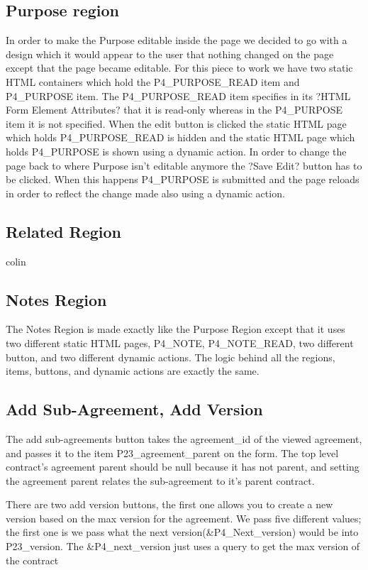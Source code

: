 \documentclass{report}
\begin{document}
\subsection{Purpose region}
In order to make the Purpose editable inside the page we decided to go with a design which it would appear to the user that nothing changed on the page except that the page became editable. For this piece to work we have two static HTML containers which hold the P4\_PURPOSE\_READ item and P4\_PURPOSE item. The P4\_PURPOSE\_READ item specifies in its ?HTML Form Element Attributes? that it is read-only whereas in the P4\_PURPOSE item it is not specified. 
	When the edit button is clicked the static HTML page which holds P4\_PURPOSE\_READ is hidden and the static HTML page which holds P4\_PURPOSE is shown using a dynamic action. In order to change the page back to where Purpose isn't editable anymore the ?Save Edit? button has to be clicked. When this happens P4\_PURPOSE is submitted and the page reloads in order to reflect the change made also using a dynamic action. 


\subsection{Related Region}
colin

\subsection{Notes Region}
The Notes Region is made exactly like the Purpose Region except that it uses two different static HTML pages, P4\_NOTE, P4\_NOTE\_READ, two different button, and two different dynamic actions. The logic behind all the regions, items, buttons, and dynamic actions are exactly the same.

\subsection{Add Sub-Agreement, Add Version}
The add sub-agreements button takes the agreement\_id of the viewed agreement, and passes it to the item P23\_agreement\_parent on the form. The top level contract's agreement parent should be null because it has not parent, and setting the agreement parent relates the sub-agreement to it's parent contract.

There are two add version buttons, the first one allows you to create a new version based on the max version for the agreement. We pass five different values; the first one is we pass what the next version(\&P4\_Next\_version) would be into P23\_version. The \&P4\_next\_version just uses a query to get the max version of the contract
\end{document}
